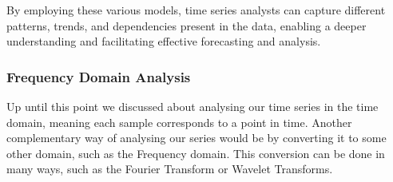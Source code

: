 \documentclass[../main.tex]{subfiles}
\begin{document}
        By employing these various models, time series analysts can capture different patterns, trends, and dependencies present in the data, enabling a deeper understanding and facilitating effective forecasting and analysis.
    
    \subsubsection{Frequency Domain Analysis}
        Up until this point we discussed about analysing our time series in the time domain, meaning each sample corresponds to a point in time. Another complementary way of analysing our series would be by converting it to some other domain, such as the Frequency domain. This conversion can be done in many ways, such as the Fourier Transform or Wavelet Transforms. \par

        
\end{document}
